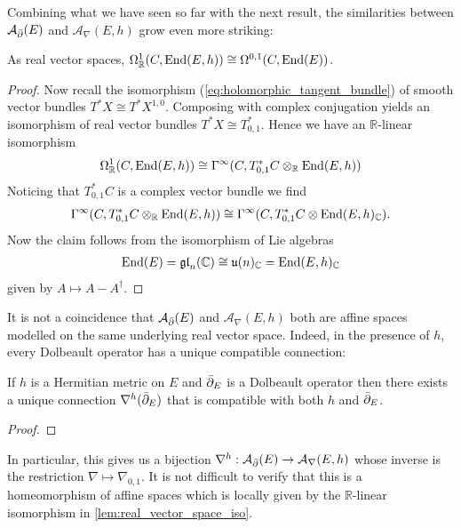 \documentclass[12pt]{ociamthesis}  %
\begin{document}
Combining what we have seen so far with the next result, the
similarities between $\mathcal A_{\bar{\partial}} (E)$ and $\mathcal A_\nabla(E,h)$ grow even more
striking:

\begin{lemma}\label{lem:real_vector_space_iso}
  As real vector spaces,
  $\Omega^1_{\mathbb{R}}(C,\operatorname{End}(E,h))\cong\Omega^{0,1}(C,\operatorname{End}(E))$.
  \begin{proof}
    Now recall the isomorphism (\ref{eq:holomorphic_tangent_bundle}) of
    smooth vector bundles $T^* X \cong T^*X^{1,0}$. Composing with
    complex conjugation yields an isomorphism of real vector bundles
    $T^*X \cong T^*_{0,1}$. Hence we have an $\mathbb{R}$-linear
    isomorphism
    \begin{align*}
      \Omega^1_{\mathbb{R}}(C,\operatorname{End}(E,h))
      \cong \Gamma^\infty(C,T^*_{0,1}C \otimes_{\mathbb{R}}\operatorname{End}(E,h))
    \end{align*}
    Noticing that $T_{0,1}^* C$ is a complex vector bundle
    we find
    \begin{align*}
      \Gamma^\infty(C,T^*_{0,1}C \otimes_{\mathbb{R}}\operatorname{End}(E,h))
      \cong\Gamma^\infty(C,T^*_{0,1}C \otimes\operatorname{End}(E,h)_{\mathbb{C}}).
    \end{align*}
    Now the claim follows from the isomorphism of Lie algebras
    \begin{align*}
      \operatorname{End}(E)
      =\mathfrak{gl}_n(\mathbb{C})
      \cong\mathfrak u(n)_{\mathbb{C}}
      =\operatorname{End}(E,h)_{\mathbb C}
    \end{align*}
    given by $A \mapsto A-A^\dagger$.
  \end{proof}
\end{lemma}

It is not a coincidence that $\mathcal A_{\bar{\partial}} (E)$ and $\mathcal A_\nabla(E,h)$ both are
affine spaces modelled on the same underlying real vector space.
Indeed, in the presence of $h$, every Dolbeault operator has a unique
compatible connection:

\begin{theorem}\label{thm:chern_connection}
  If $h$ is a Hermitian metric on $E$ and ${\bar{\partial}}_E$ is a Dolbeault
  operator then there exists a unique connection $\nabla^h({\bar{\partial}}_E)$
  that is compatible with both $h$ and ${\bar{\partial}}_E$.
  \begin{proof}
    \missingproof
  \end{proof}
\end{theorem}

In particular, this gives us a bijection
$\nabla^h : \mathcal A_{\bar{\partial}} (E) \to \mathcal A_\nabla(E,h)$ whose inverse is the restriction
$\nabla \mapsto \nabla_{0,1}$. It is not difficult to verify that this
is a homeomorphism of affine spaces which is locally given by
the $\mathbb{R}$-linear isomorphism in \ref{lem:real_vector_space_iso}.
\end{document}
